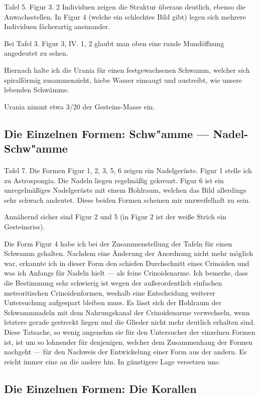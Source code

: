 \documentclass[a4paper, 12pt, oneside]{article}
\begin{document}
Tafel 5. Figur 3. 2 Individuen zeigen die Struktur überaus deutlich, ebenso die Anwachsstellen. In Figur 4 (welche ein schlechtes Bild gibt) legen sich mehrere Individuen fächerartig aneinander.

Bei Tafel 3. Figur 3, IV. 1, 2 glaubt man oben eine runde Mundöffnung angedeutet zu sehen.

Hiernach halte ich die Urania für einen festgewachsenen Schwamm, welcher sich spiralförmig zusammenzieht, hiebe Wasser einsaugt und austreibt, wie unsere lebenden Schwämme.

Urania nimmt etwa 3/20 der Gesteins-Masse ein.
\clearpage
\subsection{Die Einzelnen Formen: Schw"amme --- Nadel-Schw"amme}
\paragraph{}
Tafel 7. Die Formen Figur 1, 2, 3, 5, 6 zeigen ein Nadelgerüste. Figur 1 stelle ich zu Astrospongia. Die Nadeln liegen regelmäßig gekreuzt. Figur 6 ist ein unregelmäßiges Nadelgerüste mit einem Hohlraum, welchen das Bild allerdings sehr schwach andeutet. Diese beiden Formen scheinen mir unzweifelhaft zu sein.

Annähernd sicher sind Figur 2 und 5 (in Figur 2 ist der weiße Strich ein Gesteinsriss).

Die Form Figur 4 habe ich bei der Zusammenstellung der Tafeln für einen Schwamm gehalten. Nachdem eine Änderung der Anordnung nicht mehr möglich war, erkannte ich in dieser Form den schiefen Durchschnitt eines Crinoiden und was ich Anfangs für Nadeln hielt — als feine Crinoidenarme. Ich bemerke, dass die Bestimmung sehr schwierig ist wegen der außerordentlich einfachen meteoritischen Crinoidenformen, weshalb eine Entscheidung weiterer Untersuchung aufgespart bleiben muss. Es lässt sich der Hohlraum der Schwammnadeln mit dem Nahrungskanal der Crinoidenarme verwechseln, wenn letztere gerade gestreckt liegen und die Glieder nicht mehr deutlich erhalten sind. Diese Tatsache, so wenig angenehm sie für den Untersucher der einzelnen Formen ist, ist um so lohnender für denjenigen, welcher dem Zusammenhang der Formen nachgeht — für den Nachweis der Entwickelung einer Form aus der andern. Es reicht immer eine an die andere hin. In günstigere Lage versetzen uns:
\clearpage
\subsection{Die Einzelnen Formen: Die Korallen}
\end{document}
